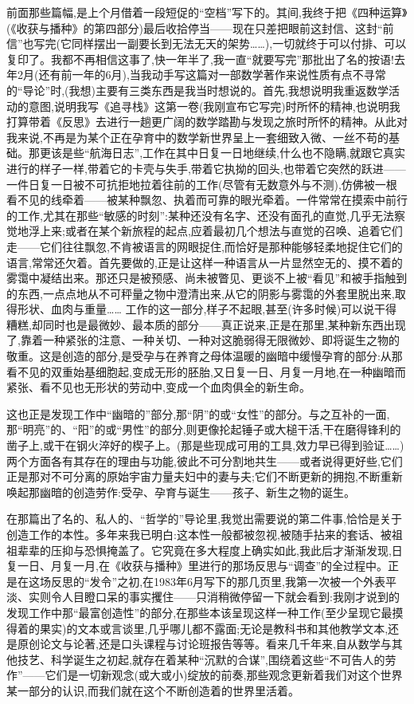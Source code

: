 前面那些篇幅,是上个月借着一段短促的“空档”写下的。其间,我终于把《四种运算》(《收获与播种》的第四部分)最后收拾停当——现在只差把眼前这封信、这封“前信”也写完(它同样摆出一副要长到无法无天的架势……),一切就终于可以付排、可以复印了。我都不再相信这事了,快一年半了,我一直“就要写完”那批出了名的按语!去年2月(还有前一年的6月),当我动手写这篇对一部数学著作来说性质有点不寻常的“导论”时,(我想)主要有三类东西是我当时想说的。首先,我想说明我重返数学活动的意图,说明我写《追寻栈》这第一卷(我刚宣布它写完)时所怀的精神,也说明我打算带着《反思》去进行一趟更广阔的数学踏勘与发现之旅时所怀的精神。从此对我来说,不再是为某个正在孕育中的数学新世界呈上一套细致入微、一丝不苟的基础。那更该是些“航海日志”,工作在其中日复一日地继续,什么也不隐瞒,就跟它真实进行的样子一样,带着它的卡壳与失手,带着它执拗的回头,也带着它突然的跃进——一件日复一日被不可抗拒地拉着往前的工作(尽管有无数意外与不测),仿佛被一根看不见的线牵着——被某种飘忽、执着而可靠的眼光牵着。一件常常在摸索中前行的工作,尤其在那些“敏感的时刻”:某种还没有名字、还没有面孔的直觉,几乎无法察觉地浮上来;或者在某个新旅程的起点,应着最初几个想法与直觉的召唤、追着它们走——它们往往飘忽,不肯被语言的网眼捉住,而恰好是那种能够轻柔地捉住它们的语言,常常还欠着。首先要做的,正是让这样一种语言从一片显然空无的、摸不着的雾霭中凝结出来。那还只是被预感、尚未被瞥见、更谈不上被“看见”和被手指触到的东西,一点点地从不可秤量之物中澄清出来,从它的阴影与雾霭的外套里脱出来,取得形状、血肉与重量……
工作的这一部分,样子不起眼,甚至(许多时候)可以说干得糟糕,却同时也是最微妙、最本质的部分——真正说来,正是在那里,某种新东西出现了,靠着一种紧张的注意、一种关切、一种对这脆弱得无限微妙、即将诞生之物的敬重。这是创造的部分,是受孕与在养育之母体温暖的幽暗中缓慢孕育的部分:从那看不见的双重始基细胞起,变成无形的胚胎,又日复一日、月复一月地,在一种幽暗而紧张、看不见也无形状的劳动中,变成一个血肉俱全的新生命。

这也正是发现工作中“幽暗的”部分,那“阴”的或“女性”的部分。与之互补的一面,那“明亮”的、“阳”的或“男性”的部分,则更像抡起锤子或大槌干活,干在磨得锋利的凿子上,或干在钢火淬好的楔子上。(那是些现成可用的工具,效力早已得到验证……)两个方面各有其存在的理由与功能,彼此不可分割地共生——或者说得更好些,它们正是那对不可分离的原始宇宙力量夫妇中的妻与夫;它们不断更新的拥抱,不断重新唤起那幽暗的创造劳作:受孕、孕育与诞生——孩子、新生之物的诞生。

在那篇出了名的、私人的、“哲学的”导论里,我觉出需要说的第二件事,恰恰是关于创造工作的本性。多年来我已明白:这本性一般都被忽视,被随手拈来的套话、被祖祖辈辈的压抑与恐惧掩盖了。它究竟在多大程度上确实如此,我此后才渐渐发现,日复一日、月复一月,在《收获与播种》里进行的那场反思与“调查”的全过程中。正是在这场反思的“发令”之初,在1983年6月写下的那几页里,我第一次被一个外表平淡、实则令人目瞪口呆的事实攫住——只消稍微停留一下就会看到:我刚才说到的发现工作中那“最富创造性”的部分,在那些本该呈现这样一种工作(至少呈现它最摸得着的果实)的文本或言谈里,几乎哪儿都不露面;无论是教科书和其他教学文本,还是原创论文与论著,还是口头课程与讨论班报告等等。看来几千年来,自从数学与其他技艺、科学诞生之初起,就存在着某种“沉默的合谋”,围绕着这些“不可告人的劳作”——它们是一切新观念(或大或小)绽放的前奏,那些观念更新着我们对这个世界某一部分的认识,而我们就在这个不断创造着的世界里活着。


